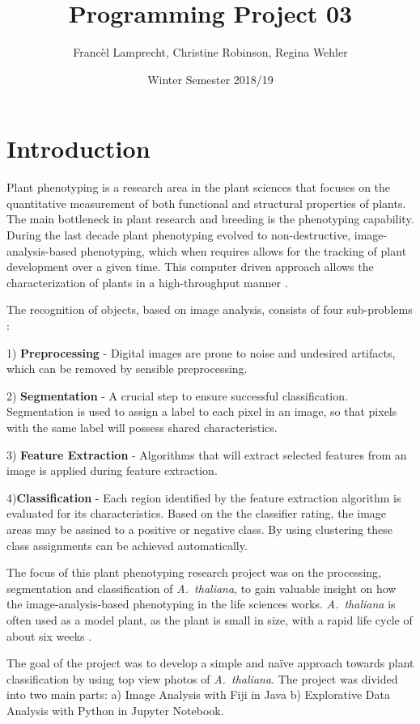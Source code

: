 \documentclass[paper=A4,bibliography=totocnumbered]{scrartcl}
\title{Programming Project 03}
\author{Francèl Lamprecht, Christine Robinson, Regina Wehler}
\date{Winter Semester 2018/19}
\begin{document}
\maketitle

\tableofcontents
\clearpage
\section{Introduction}
Plant phenotyping is a research  area in the plant sciences that focuses on the quantitative measurement of both functional and structural properties of plants. The main bottleneck in plant research and breeding is the phenotyping capability. During the last decade plant phenotyping evolved to non-destructive, image-analysis-based phenotyping, which when requires allows for the tracking of plant development over a given time. This computer driven approach allows the characterization of plants in a high-throughput manner \citep{Walter.2015}.

The recognition of objects, based on image analysis, consists of four sub-problems \citep{Adams.2018}: \par
1) \textbf{Preprocessing} - Digital images are prone to noise and undesired artifacts, which can be removed by sensible preprocessing. \par
2) \textbf{Segmentation} - A crucial step to ensure successful classification. Segmentation is used to assign a label to each pixel in an image, so that pixels with the same label will possess shared characteristics. \par
3) \textbf{Feature Extraction} - Algorithms that will extract selected features from an image is applied during feature extraction. \par
4)\textbf{Classification} - Each region identified by the feature extraction algorithm is evaluated for its characteristics. Based on the the classifier rating, the image areas may be assined to  a positive or negative class. By using clustering these class assignments can be achieved automatically. \par

The focus of this plant phenotyping research project was on the processing, segmentation and classification of \textit{A.~thaliana}, to gain valuable insight on how the image-analysis-based phenotyping in the life sciences works. \textit{A.~thaliana} is often used as a model plant, as the plant is small in size, with a rapid life cycle of about six weeks \citep{Koornneef.2010}. 

The goal of the project was to develop a simple and naïve approach towards plant classification by using top view photos of  \textit{A.~thaliana}. The project was divided into two main parts:
a) Image Analysis with Fiji in Java
b) Explorative Data Analysis with Python in Jupyter Notebook.
\end{document}
